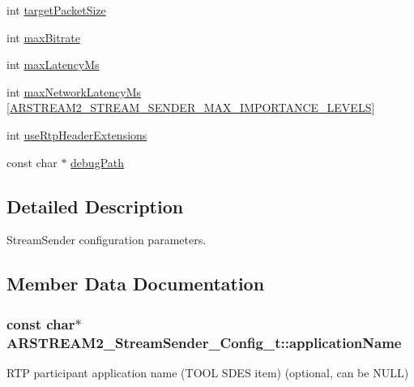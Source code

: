 \begin{DoxyCompactItemize}
int \hyperlink{struct_a_r_s_t_r_e_a_m2___stream_sender___config__t_aa88a311e8596181704d2a617be83028f}{target\+Packet\+Size}
\item 
int \hyperlink{struct_a_r_s_t_r_e_a_m2___stream_sender___config__t_aaf186fd66dde20582c813d65aa83288e}{max\+Bitrate}
\item 
int \hyperlink{struct_a_r_s_t_r_e_a_m2___stream_sender___config__t_ad5c6d9bb419ef9c7ce6a6294cb4a6448}{max\+Latency\+Ms}
\item 
int \hyperlink{struct_a_r_s_t_r_e_a_m2___stream_sender___config__t_a8a1c3b6ac08d2e415e8d8b24089ceaa9}{max\+Network\+Latency\+Ms} \mbox{[}\hyperlink{arstream2__stream__stats_8h_ab4197b48e3f5b7133448bee1bae350e7}{A\+R\+S\+T\+R\+E\+A\+M2\+\_\+\+S\+T\+R\+E\+A\+M\+\_\+\+S\+E\+N\+D\+E\+R\+\_\+\+M\+A\+X\+\_\+\+I\+M\+P\+O\+R\+T\+A\+N\+C\+E\+\_\+\+L\+E\+V\+E\+LS}\mbox{]}
\item 
int \hyperlink{struct_a_r_s_t_r_e_a_m2___stream_sender___config__t_a653d22d6f8843a1a668979c680c06bc7}{use\+Rtp\+Header\+Extensions}
\item 
const char $\ast$ \hyperlink{struct_a_r_s_t_r_e_a_m2___stream_sender___config__t_ab7232a8b659cb75b80946dad90aa05c8}{debug\+Path}
\end{DoxyCompactItemize}


\subsection{Detailed Description}
Stream\+Sender configuration parameters. 

\subsection{Member Data Documentation}
\subsubsection[{\texorpdfstring{application\+Name}{applicationName}}]{\setlength{\rightskip}{0pt plus 5cm}const char$\ast$ A\+R\+S\+T\+R\+E\+A\+M2\+\_\+\+Stream\+Sender\+\_\+\+Config\+\_\+t\+::application\+Name}\hypertarget{struct_a_r_s_t_r_e_a_m2___stream_sender___config__t_a15da681a26d0f6ea932bf229898ac09f}{}\label{struct_a_r_s_t_r_e_a_m2___stream_sender___config__t_a15da681a26d0f6ea932bf229898ac09f}
R\+TP participant application name (T\+O\+OL S\+D\+ES item) (optional, can be N\+U\+LL) 
